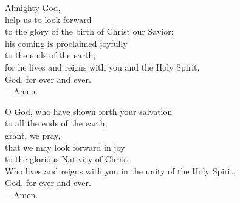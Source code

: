 \prayer


\begin{prayerverse}
Almighty God,\\
help us to look forward\\
to the glory of the birth of Christ our Savior:\\
his coming is proclaimed joyfully\\
to the ends of the earth,\\
for he lives and reigns with you and the Holy Spirit,\\
God, for ever and ever.\\
{\color{red}---\thinspace}Amen.
\end{prayerverse}


\begin{prayerverse}
O God, who have shown forth your salvation\\
to all the ends of the earth,\\
grant, we pray,\\
that we may look forward in joy\\
to the glorious Nativity of Christ.\\
Who lives and reigns with you in the unity of the Holy Spirit,\\
God, for ever and ever.\\
{\color{red}---\thinspace}Amen.
\end{prayerverse}

